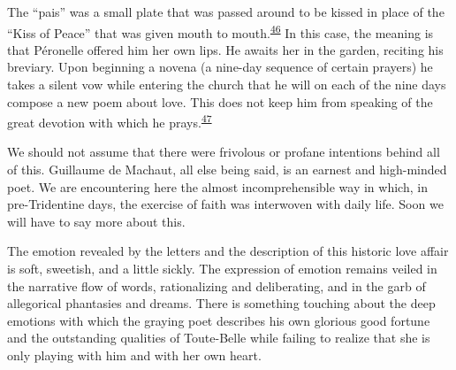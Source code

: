 The ``pais'' was a small plate that was passed around to be kissed in
place of the ``Kiss of Peace'' that was given mouth to
mouth.\textsuperscript{\protect\hypertarget{11_Chapter_Four__THE_FORMS_OF_LOVE.xhtmlux5cux23id_1397}{\protect\hyperlink{23_NOTES.xhtmlux5cux23id_1398}{46}}}
In this case, the meaning is that Péronelle offered him her own lips. He
awaits her in the garden, reciting his breviary. Upon beginning a novena
(a nine-day sequence of certain prayers) he takes a silent vow while
entering the church that he will on each of the nine days compose a new
poem about love. This does not keep him from speaking of the great
devotion with which he
prays.\textsuperscript{\protect\hypertarget{11_Chapter_Four__THE_FORMS_OF_LOVE.xhtmlux5cux23id_1395}{\protect\hyperlink{23_NOTES.xhtmlux5cux23id_1396}{47}}}

We should not assume that there were frivolous or profane intentions
behind all of this. Guillaume de Machaut, all else being said, is an
earnest and high-minded poet. We are encountering here the almost
incomprehensible way in which, in pre-Tridentine days, the exercise of
faith was interwoven with daily life. Soon we will have to say more
about this.

The emotion revealed by the letters and the description of this historic
love affair is soft, sweetish, and a little sickly. The expression of
emotion remains veiled in the narrative flow of words, rationalizing and
deliberating, and in the garb of allegorical phantasies and dreams.
There is something touching about the deep emotions with which the
graying poet describes his own glorious good fortune and the outstanding
qualities of Toute-Belle while failing to realize that she is only
playing with him and with her own heart.


